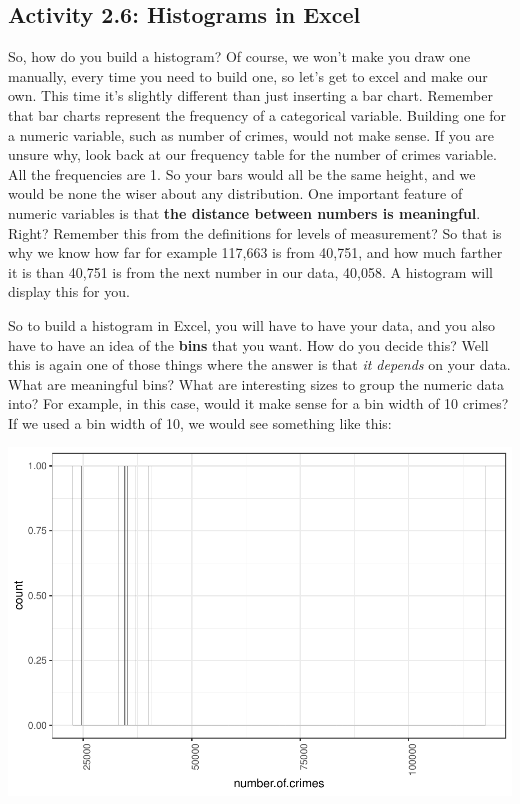 \documentclass[
]{book}
\begin{document}
\hypertarget{activity-2.6-histograms-in-excel}{%
\subsection{Activity 2.6: Histograms in Excel}\label{activity-2.6-histograms-in-excel}}

So, how do you build a histogram? Of course, we won't make you draw one manually, every time you need to build one, so let's get to excel and make our own. This time it's slightly different than just inserting a bar chart. Remember that bar charts represent the frequency of a categorical variable. Building one for a numeric variable, such as number of crimes, would not make sense. If you are unsure why, look back at our frequency table for the number of crimes variable. All the frequencies are 1. So your bars would all be the same height, and we would be none the wiser about any distribution. One important feature of numeric variables is that \textbf{the distance between numbers is meaningful}. Right? Remember this from the definitions for levels of measurement? So that is why we know how far for example 117,663 is from 40,751, and how much farther it is than 40,751 is from the next number in our data, 40,058. A histogram will display this for you.

So to build a histogram in Excel, you will have to have your data, and you also have to have an idea of the \textbf{bins} that you want. How do you decide this? Well this is again one of those things where the answer is that \emph{it depends} on your data. What are meaningful bins? What are interesting sizes to group the numeric data into? For example, in this case, would it make sense for a bin width of 10 crimes? If we used a bin width of 10, we would see something like this:

\includegraphics{bookdown-demo_files/figure-latex/unnamed-chunk-21-1.pdf}
\end{document}
